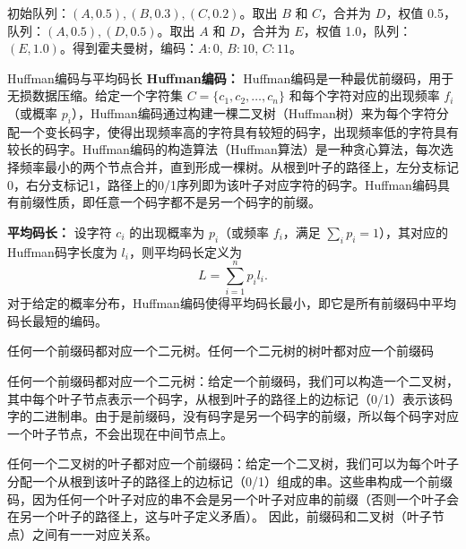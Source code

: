 \documentclass[lang=cn,11pt]{elegantbook}
\begin{document}
初始队列：$(A,0.5), (B,0.3), (C,0.2)$。取出 $B$ 和 $C$，合并为 $D$，权值 0.5，队列：$(A,0.5), (D,0.5)$。取出 $A$ 和 $D$，合并为 $E$，权值 1.0，队列：$(E,1.0)$。得到霍夫曼树，编码：$A:0$, $B:10$, $C:11$。
\begin{definition}{Huffman编码与平均码长}
\textbf{Huffman编码：} Huffman编码是一种最优前缀码，用于无损数据压缩。给定一个字符集 $C = \{c_1, c_2, \dots, c_n\}$ 和每个字符对应的出现频率 $f_i$（或概率 $p_i$），Huffman编码通过构建一棵二叉树（Huffman树）来为每个字符分配一个变长码字，使得出现频率高的字符具有较短的码字，出现频率低的字符具有较长的码字。Huffman编码的构造算法（Huffman算法）是一种贪心算法，每次选择频率最小的两个节点合并，直到形成一棵树。从根到叶子的路径上，左分支标记0，右分支标记1，路径上的0/1序列即为该叶子对应字符的码字。Huffman编码具有前缀性质，即任意一个码字都不是另一个码字的前缀。

\textbf{平均码长：} 设字符 $c_i$ 的出现概率为 $p_i$（或频率 $f_i$，满足 $\sum_i p_i = 1$），其对应的Huffman码字长度为 $l_i$，则平均码长定义为
\[
L = \sum_{i=1}^n p_i l_i.
\]
对于给定的概率分布，Huffman编码使得平均码长最小，即它是所有前缀码中平均码长最短的编码。
\end{definition}
\begin{theorem}
任何一个前缀码都对应一个二元树。任何一个二元树的树叶都对应一个前缀码
\end{theorem}
任何一个前缀码都对应一个二元树：给定一个前缀码，我们可以构造一个二叉树，其中每个叶子节点表示一个码字，从根到叶子的路径上的边标记（0/1）表示该码字的二进制串。由于是前缀码，没有码字是另一个码字的前缀，所以每个码字对应一个叶子节点，不会出现在中间节点上。

任何一个二叉树的叶子都对应一个前缀码：给定一个二叉树，我们可以为每个叶子分配一个从根到该叶子的路径上的边标记（0/1）组成的串。这些串构成一个前缀码，因为任何一个叶子对应的串不会是另一个叶子对应串的前缀（否则一个叶子会在另一个叶子的路径上，这与叶子定义矛盾）。
因此，前缀码和二叉树（叶子节点）之间有一一对应关系。
\end{document}
